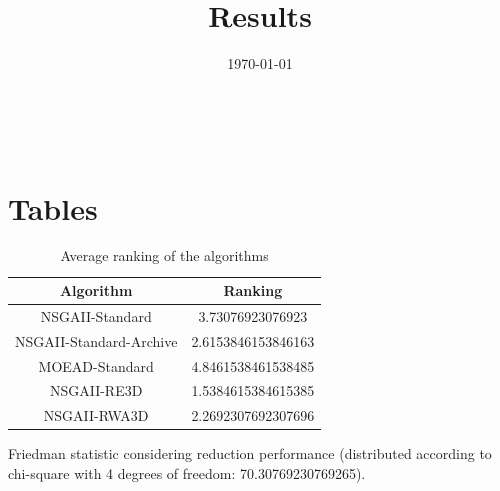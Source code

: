 \documentclass{article}
\title{Results}
\author{}
\date{\today}
\begin{document}
\oddsidemargin 0in \topmargin 0in\maketitle
\
\section{Tables}
\begin{table}[!htp]
\centering
\caption{Average ranking of the algorithms}
\begin{tabular}{c|c}
Algorithm&Ranking\\
\hline
NSGAII-Standard&3.73076923076923\\
NSGAII-Standard-Archive&2.6153846153846163\\
MOEAD-Standard&4.8461538461538485\\
NSGAII-RE3D&1.5384615384615385\\
NSGAII-RWA3D&2.2692307692307696\\
\end{tabular}
\end{table}


Friedman statistic considering reduction performance (distributed according to chi-square with 4 degrees of freedom: 70.30769230769265).
\end{document}
